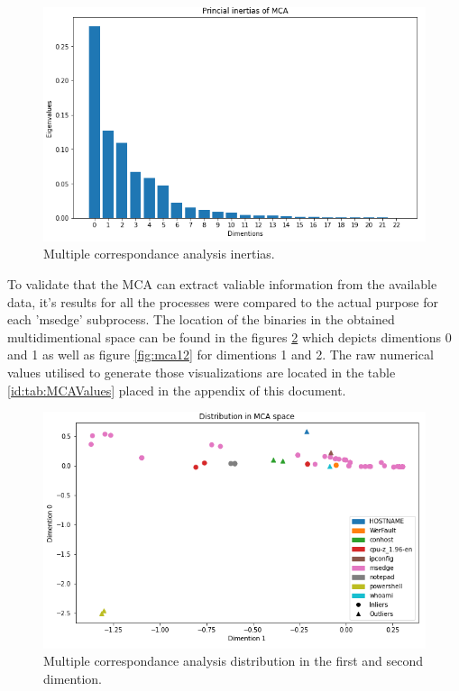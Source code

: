 \documentclass[a4paper,twoside,12pt]{book}
\begin{document}
\begin{figure}
	\centering
	\includegraphics[scale=0.9]{images/MCAEigenvalues}
	\caption{Multiple correspondance analysis inertias.}
	\label{fig:mcaInertias}
 \end{figure}

To validate that the MCA can extract valiable information from the available data, it's results for all
the processes were compared to the actual purpose for each 'msedge' subprocess. The location of the
binaries in the obtained multidimentional space can be found in the figures \ref{fig:mca01} which 
depicts dimentions 0 and 1 as well as figure \ref{fig:mca12} for dimentions 1 and 2. The raw numerical 
values utilised to generate those visualizations are located in the table \ref{id:tab:MCAValues} placed 
in the appendix of this document. 


\begin{figure}
	\centering
	\includegraphics[scale=0.9]{images/MCA01}
	\caption{Multiple correspondance analysis distribution in the first and second dimention.}
	\label{fig:mca01}
 \end{figure}
\end{document}
